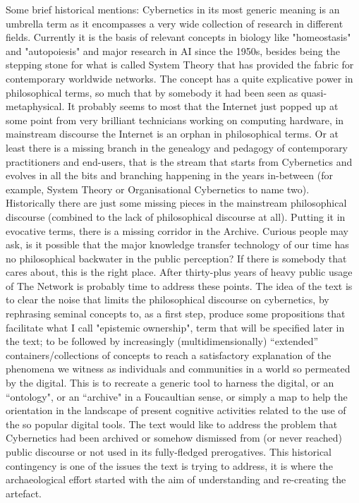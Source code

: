 \documentclass[14pt]{extarticle}
\begin{document}
\newline
\hspace*{15mm}Some brief historical mentions: Cybernetics in its most generic meaning is an umbrella term as it encompasses a very wide collection of research in different fields. Currently it is the basis of relevant concepts in biology like "homeostasis" and "autopoiesis" and major research in AI since the 1950s, besides being the stepping stone for what is called System Theory that has provided the fabric for contemporary worldwide networks. The concept has a quite explicative power in philosophical terms, so much that by somebody it had been seen as quasi-metaphysical. It probably seems to most that the Internet just popped up at some point from very brilliant technicians working on computing hardware, in mainstream discourse the Internet is an orphan in philosophical terms. Or at least there is a missing branch in the genealogy and pedagogy of contemporary practitioners and end-users, that is the stream that starts from Cybernetics and evolves in all the bits and branching happening in the years in-between (for example, System Theory or Organisational Cybernetics to name two). Historically there are just some missing pieces in the mainstream philosophical discourse (combined to the lack of philosophical discourse at all). Putting it in evocative terms, there is a missing corridor in the Archive. Curious people may ask, is it possible that the major knowledge transfer technology of our time has no philosophical backwater in the public perception? If there is somebody that cares about, this is the right place. After thirty-plus years of heavy public usage of The Network is probably time to address these points.
\newline
\hspace*{15mm}The idea of the text is to clear the noise that limits the philosophical discourse on cybernetics, by rephrasing seminal concepts to, as a first step, produce some propositions that facilitate what I call "epistemic ownership", term that will be specified later in the text; to be followed by increasingly (multidimensionally) “extended” containers/collections of concepts to reach a satisfactory explanation of the phenomena we witness as individuals and communities in a world so permeated by the digital. This is to recreate a generic tool to harness the digital, or an “ontology", or an “archive" in a Foucaultian sense, or simply a map to help the orientation in the landscape of present cognitive activities related to the use of the so popular digital tools. The text would like to address the problem that Cybernetics had been archived or somehow dismissed from (or never reached) public discourse or not used in its fully-fledged prerogatives. This historical contingency is one of the issues the text is trying to address, it is where the archaeological effort started with the aim of understanding and re-creating the artefact.
\end{document}
